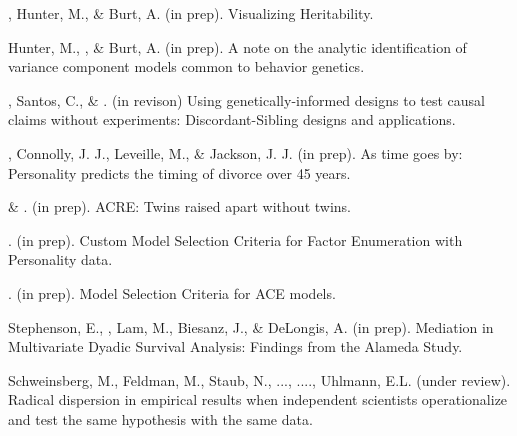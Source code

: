 \item \meb, Hunter, M., \& Burt, A. (in prep). Visualizing Heritability.

\item Hunter, M., \meb, \& Burt, A. (in prep). A note on the analytic identification of variance component models common to behavior genetics.

\item \meb, Santos, C., \& \joe. (in revison) Using genetically-informed designs to test causal claims without experiments: Discordant-Sibling designs and applications. \href{https://osf.io/zpdwt/}{\small\color{blue}{osf.io/zpdwt/}}%

\item\meb, Connolly, J. J., Leveille, M., \& Jackson, J. J. (in prep). As time goes by: Personality predicts the timing of divorce over 45 years.%
\item \meb \& \joe.  (in prep). ACRE: Twins raised apart without twins.
\item \meb. (in prep). Custom Model Selection Criteria for Factor Enumeration with Personality data.
\item \meb. (in prep). Model Selection Criteria for ACE models.
\item Stephenson, E., \meb, Lam, M., Biesanz, J., \& DeLongis, A. (in prep). Mediation in Multivariate Dyadic Survival Analysis: Findings from the Alameda Study. %
\item Schweinsberg, M., Feldman, M., Staub, N., ..., \meb ...., Uhlmann, E.L. (under review). Radical dispersion in empirical results when independent scientists operationalize and test the same hypothesis with the same data. %
\vspace{-2mm}\begin{center}\end{center} \vspace{-4mm}
